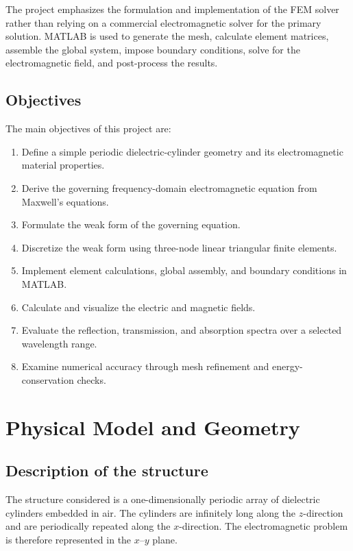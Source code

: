\documentclass{article}
\begin{document}
The project emphasizes the formulation and implementation of the FEM
solver rather than relying on a commercial electromagnetic solver for the
primary solution. MATLAB is used to generate the mesh, calculate element
matrices, assemble the global system, impose boundary conditions, solve
for the electromagnetic field, and post-process the results.

\section{Objectives}

The main objectives of this project are:
\begin{enumerate}[label=\arabic*.]
    \item Define a simple periodic dielectric-cylinder geometry and its
    electromagnetic material properties.
    \item Derive the governing frequency-domain electromagnetic equation
    from Maxwell's equations.
    \item Formulate the weak form of the governing equation.
    \item Discretize the weak form using three-node linear triangular
    finite elements.
    \item Implement element calculations, global assembly, and boundary
    conditions in MATLAB.
    \item Calculate and visualize the electric and magnetic fields.
    \item Evaluate the reflection, transmission, and absorption spectra
    over a selected wavelength range.
    \item Examine numerical accuracy through mesh refinement and
    energy-conservation checks.
\end{enumerate}

\chapter{Physical Model and Geometry}

\section{Description of the structure}

The structure considered is a one-dimensionally periodic array of
dielectric cylinders embedded in air. The cylinders are infinitely long
along the $z$-direction and are periodically repeated along the $x$-direction.
The electromagnetic problem is therefore represented in the $x$--$y$ plane.
\end{document}
